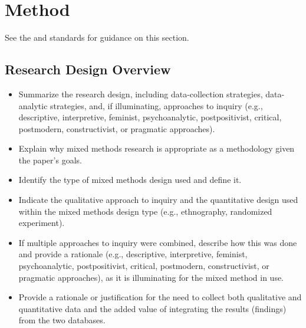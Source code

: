 \documentclass[acmsmall]{acmart}
\begin{document}
\section{Method}

See the \hyperlink{https://apastyle.apa.org/jars/quantitative}{\color{blue}{JARS-QUANT}} and \hyperlink{https://apastyle.apa.org/jars/qualitative}{\color{blue}{JARS-QUAL}} standards for guidance on this section.

\subsection{Research Design Overview}

\begin{itemize}
\item Summarize the research design, including data-collection strategies, data-analytic strategies, and, if illuminating, approaches to inquiry (e.g., descriptive, interpretive, feminist, psychoanalytic, postpositivist, critical, postmodern, constructivist, or pragmatic approaches).
\item Explain why mixed methods research is appropriate as a methodology given the paper’s goals.
\item Identify the type of mixed methods design used and define it.
\item Indicate the qualitative approach to inquiry and the quantitative design used within the mixed methods design type (e.g., ethnography, randomized experiment).
\item If multiple approaches to inquiry were combined, describe how this was done and provide a rationale (e.g., descriptive, interpretive, feminist, psychoanalytic, postpositivist, critical, postmodern, constructivist, or pragmatic approaches), as it is illuminating for the mixed method in use.
\item Provide a rationale or justification for the need to collect both qualitative and quantitative data and the added value of integrating the results (findings) from the two databases.
\end{itemize}
\end{document}
